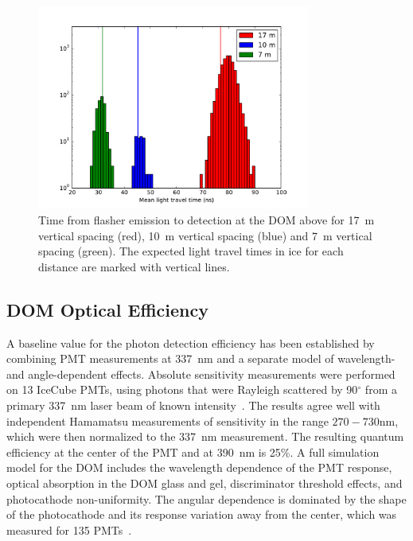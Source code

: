 \begin{figure}[!h]
  \captionsetup[subfigure]{labelformat=empty}
  \centering
  \includegraphics[width=0.8\textwidth]{graphics/dom/rapcal/flashmean.pdf}
  \caption{Time from flasher emission to detection at the DOM above for 17~m vertical spacing
    (red), 10~m vertical spacing (blue) and 7~m vertical spacing
    (green). The expected light travel times in ice for each distance are marked with
    vertical lines.}
  \label{fig:flashertiming}
\end{figure}

\subsection{\label{sec:domeff}DOM Optical Efficiency}

A baseline value for the photon detection efficiency has been established
by combining PMT measurements at 337~nm and a separate model of wavelength-
and angle-dependent effects.  Absolute sensitivity measurements were
performed on 13 IceCube PMTs, using photons that were Rayleigh scattered by
90$^{\circ}$ from a primary 337~nm laser beam of known
intensity~\cite{ICECUBE:PMT}. The results agree well with independent
Hamamatsu measurements of sensitivity in the range $270-730$nm, which
were then normalized to the 337~nm measurement.  The resulting quantum
efficiency at the center of the PMT and at 390~nm is 25\%.  A full
simulation model for the DOM includes the wavelength dependence of the PMT
response, optical absorption in the DOM glass and gel, discriminator
threshold effects, and photocathode non-uniformity.  The angular dependence is
dominated by the shape of the photocathode and its response variation away
from the center, which was measured for 135 PMTs~\cite{ICECUBE:PMT}.

